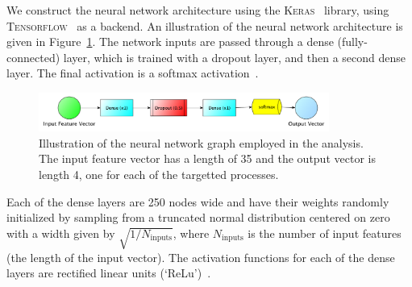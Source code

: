 
We construct the neural network architecture using the \textsc{Keras}~\cite{chollet2015keras}
library, using \textsc{Tensorflow}~\cite{tensorflow2015} as a backend.
An illustration of the neural network architecture is given in Figure~\ref{fig:nn_arch}.
The network inputs are passed through a dense (fully-connected) layer,  which
is trained with a dropout layer, and then a second dense layer.
The final activation is a softmax activation~\cite{GoodFellowBook}.

\begin{figure}[!htb]
    \begin{center}
        \includegraphics[width=0.85\textwidth]{figures/search_hh/mva/nn_arch_graph_updated}
        \caption{
            Illustration of the neural network graph employed in the analysis.
            The input feature vector has a length of 35 and the output vector is length 4,
            one for each of the targetted processes.
        }
        \label{fig:nn_arch}
    \end{center}
\end{figure}
Each of the dense layers are 250 nodes wide and  have their weights randomly initialized by sampling
from a truncated normal distribution centered on zero with a width given by $\sqrt{1/N_{\text{inputs}}}$, where
$N_{\text{inputs}}$ is the number of input features (the length of the input vector).
The activation functions for each of the dense layers are rectified linear units (`ReLu')~\cite{ReLu}.

